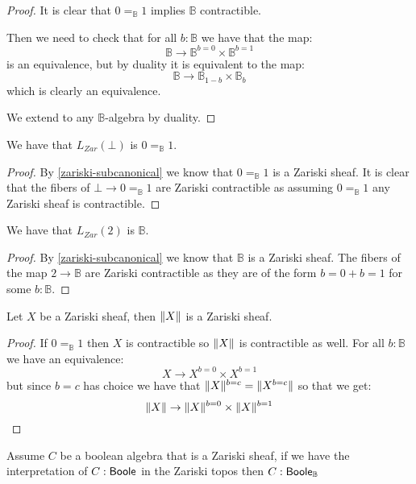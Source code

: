 \begin{proof}
It is clear that $0=_\mathbb{B}1$ implies $\mathbb{B}$ contractible.

Then we need to check that for all $b:\mathbb{B}$ we have that the map:
\[\mathbb{B} \to \mathbb{B}^{b=0}\times\mathbb{B}^{b=1}\]
is an equivalence, but by duality it is equivalent to the map:
\[\mathbb{B} \to \mathbb{B}_{1-b}\times\mathbb{B}_b\]
which is clearly an equivalence.

We extend to any $\mathbb{B}$-algebra by duality.
\end{proof}

\begin{lemma}\label{bot-zariski}
We have that $L_{Zar}(\bot)$ is $0=_\mathbb{B}1$.
\end{lemma}

\begin{proof}
By \cref{zariski-subcanonical} we know that $0=_\mathbb{B}1$ is a Zariski sheaf. It is clear that the fibers of $\bot\to 0=_\mathbb{B}1$ are Zariski contractible as assuming $0=_\mathbb{B}1$ any Zariski sheaf is contractible.
\end{proof}

\begin{lemma}\label{bool-zariski}
We have that $L_{Zar}({2})$ is $\mathbb{B}$.
\end{lemma}

\begin{proof}
By \cref{zariski-subcanonical} we know that $\mathbb{B}$ is a Zariski sheaf. The fibers of the map ${2}\to\mathbb{B}$ are Zariski contractible as they are of the form $b=0+b=1$ for some $b:\mathbb{B}$.
\end{proof}

\begin{lemma}\label{truncation-zariski}
Let $X$ be a Zariski sheaf, then $\lVert X \rVert$ is a Zariski sheaf.
\end{lemma}

\begin{proof}
If $0=_\mathbb{B}1$ then $X$ is contractible so $\lVert X \rVert$ is contractible as well. For all $b:\mathbb{B}$ we have an equivalence:
\[X\to X^{b=0}\times X^{b=1}\]
but since $b=c$ has choice we have that $\lVert X \rVert^{b=c} = \lVert X^{b=c} \rVert$ so that we get:
\[\lVert X \rVert\to \lVert X \rVert^{b=0}\times \lVert X \rVert^{b=1}\]
\end{proof}

\begin{lemma}\label{zariski-cp-iff-cp}
Assume $C$ be a boolean algebra that is a Zariski sheaf, if we have the interpretation of $C:\mathsf{Boole}$ in the Zariski topos then $C:\mathsf{Boole}_\mathbb{B}$
\end{lemma}

